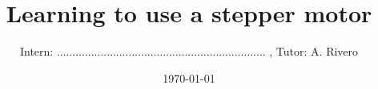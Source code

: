 \documentclass [11pt,twoside,a4paper]{article}
\title{Learning to use a stepper motor}
\author{Intern: ................................................................... , Tutor: A. Rivero}
\date{\today}
\begin{document}
\maketitle

\let\clearpage\relax %



%
%
\end{document}
